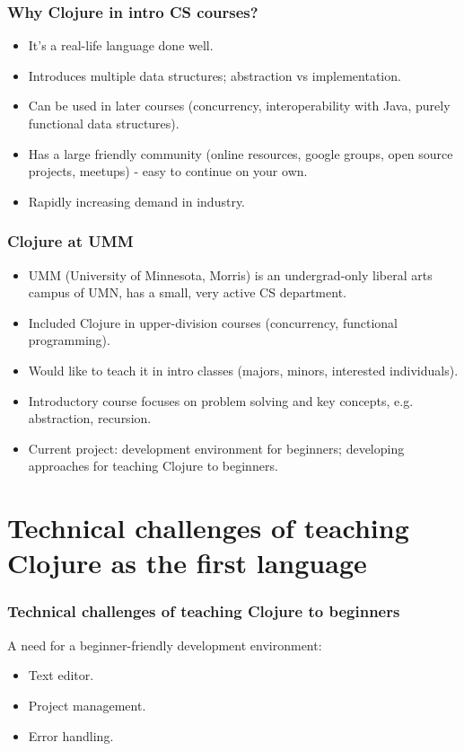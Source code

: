\documentclass{beamer}
\begin{document}
\begin{frame}
\frametitle{Why Clojure in intro CS courses?}
\begin{itemize}
\item It's a real-life language done well. 
\item Introduces multiple data structures; abstraction vs implementation. 
\item Can be used in later courses  (concurrency, interoperability with Java, purely functional data structures). 
\item Has a large friendly community (online resources, google groups, open source projects, meetups) - easy to continue on your own. 
\item Rapidly increasing demand in industry. 
\end{itemize}
\end{frame}


\begin{frame}
\frametitle{Clojure at UMM}
\begin{itemize}
\item UMM (University of Minnesota, Morris) is an undergrad-only liberal arts campus of UMN, has a small, very active CS department. 
\item Included Clojure in upper-division courses (concurrency, functional programming). 
\item Would like to teach it in intro classes (majors, minors, interested individuals).
\item Introductory course focuses on problem solving and key concepts, e.g. abstraction, recursion.
\item Current project: development environment for beginners; developing approaches for teaching Clojure to beginners. 
\end{itemize}
\end{frame}

\section{Technical challenges of teaching Clojure as the first language}

\begin{frame}
\frametitle{Technical challenges of teaching Clojure to beginners}
A need for a beginner-friendly development environment:
\begin{itemize}
\item Text editor.
\item Project management.
\item Error handling.
\end{itemize}
\end{frame}
\end{document}
